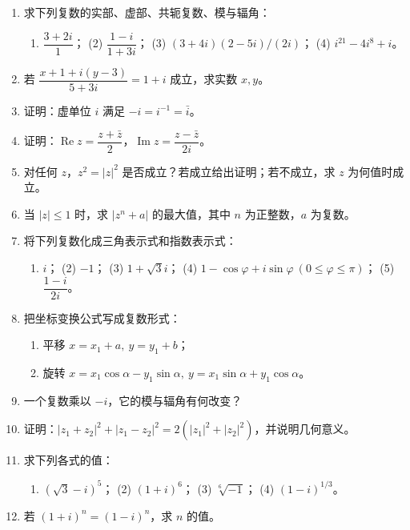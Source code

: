 \begin{enumerate}
\def\labelenumi{\arabic{enumi}.}
\item
  求下列复数的实部、虚部、共轭复数、模与辐角：

  \begin{enumerate}
  \def\labelenumii{(\arabic{enumii})}
  \tightlist
  \item
    \(\dfrac{3+2i}{1}\)； (2) \(\dfrac{1-i}{1+3i}\)； (3)
    \((3+4i)(2-5i)/(2i)\)； (4) \(i^{21}-4i^{8}+i\)。
  \end{enumerate}
\item
  若 \(\dfrac{x+1+i(y-3)}{5+3i}=1+i\) 成立，求实数 \(x,y\)。
\item
  证明：虚单位 \(i\) 满足 \(-i=i^{-1}=\bar i\)。
\item
  证明：\(\operatorname{Re}z=\dfrac{z+\bar z}{2}\)，\(\operatorname{Im}z=\dfrac{z-\bar z}{2i}\)。
\item
  对任何 \(z\)，\(z^2=|z|^2\) 是否成立？若成立给出证明；若不成立，求
  \(z\) 为何值时成立。
\item
  当 \(|z|\le 1\) 时，求 \(|z^n+a|\) 的最大值，其中 \(n\)
  为正整数，\(a\) 为复数。
\item
  将下列复数化成三角表示式和指数表示式：

  \begin{enumerate}
  \def\labelenumii{(\arabic{enumii})}
  \tightlist
  \item
    \(i\)； (2) \(-1\)； (3) \(1+\sqrt3 i\)； (4)
    \(1-\cos\varphi+i\sin\varphi\ (0\le\varphi\le\pi)\)； (5)
    \(\dfrac{1-i}{2i}\)。
  \end{enumerate}
\item
  把坐标变换公式写成复数形式：

  \begin{enumerate}
  \def\labelenumii{(\arabic{enumii})}
  \tightlist
  \item
    平移 \(x=x_1+a,\ y=y_1+b\)；
  \item
    旋转
    \(x=x_1\cos\alpha-y_1\sin\alpha,\ y=x_1\sin\alpha+y_1\cos\alpha\)。
  \end{enumerate}
\item
  一个复数乘以 \(-i\)，它的模与辐角有何改变？
\item
  证明：\(|z_1+z_2|^2+|z_1-z_2|^2=2(|z_1|^2+|z_2|^2)\)，并说明几何意义。
\item
  求下列各式的值：

  \begin{enumerate}
  \def\labelenumii{(\arabic{enumii})}
  \tightlist
  \item
    \((\sqrt3-i)^5\)； (2) \((1+i)^6\)； (3) \(\sqrt[6]{-1}\)； (4)
    \((1-i)^{1/3}\)。
  \end{enumerate}
\item
  若 \((1+i)^n=(1-i)^n\)，求 \(n\) 的值。
\end{enumerate}

